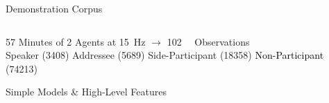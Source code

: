 \begin{frame}{Demonstration Corpus}
  \begin{columns}[T] %
    \begin{column}{.5\textwidth}
      \centering
    \end{column}%
    \begin{column}{.5\textwidth}
    \end{column}%
  \end{columns}
        57 Minutes of 2 Agents at \SI{15}{\Hz} \(\rightarrow\) \SI{102}{\kilo\nothing} Observations \\
        \footnotesize
         \textcolor{myred}{Speaker} (3408) 
         \textcolor{mygreen}{Addressee} (5689)
         \textcolor{myblue}{Side-Participant} (18358)
         \textcolor{black}{Non-Participant} (74213)
\end{frame}
\begin{frame}{Simple Models \& High-Level Features}
  \centering
\end{frame}
